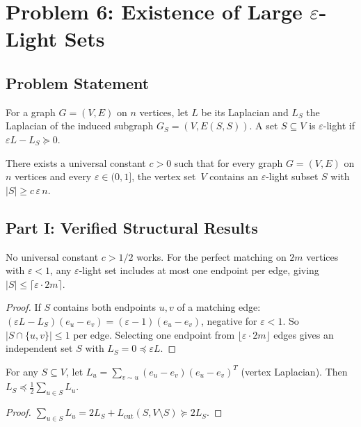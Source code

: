 \section{Problem 6: Existence of Large $\varepsilon$-Light Sets}\label{sec:q6}

\subsection*{Problem Statement}
For a graph $G=(V,E)$ on $n$ vertices, let $L$ be its Laplacian and $L_S$ the Laplacian of the induced subgraph $G_S=(V,E(S,S))$. A set $S\subseteq V$ is $\varepsilon$-light if $\varepsilon L-L_S\succeq 0$.

\begin{conjecture}[Q6]\label{conj:q6}
There exists a universal constant $c>0$ such that for every graph $G=(V,E)$ on $n$ vertices and every $\varepsilon\in(0,1]$, the vertex set~$V$ contains an $\varepsilon$-light subset $S$ with $|S|\ge c\,\varepsilon\, n$.
\end{conjecture}

\subsection*{Part I: Verified Structural Results}

\begin{proposition}\label{prop:q6-upper}
No universal constant $c>1/2$ works. For the perfect matching on $2m$ vertices with $\varepsilon<1$, any $\varepsilon$-light set includes at most one endpoint per edge, giving $|S|\le\lceil\varepsilon\cdot 2m\rceil$.
\end{proposition}

\begin{proof}
If $S$ contains both endpoints $u,v$ of a matching edge: $(\varepsilon L-L_S)(e_u-e_v)=(\varepsilon-1)(e_u-e_v)$, negative for $\varepsilon<1$. So $|S\cap\{u,v\}|\le 1$ per edge. Selecting one endpoint from $\lfloor\varepsilon\cdot 2m\rfloor$ edges gives an independent set $S$ with $L_S=0\preceq\varepsilon L$.
\end{proof}

\begin{lemma}[Linearization]\label{lem:q6-lin}
For any $S\subseteq V$, let $L_u=\sum_{v\sim u}(e_u-e_v)(e_u-e_v)^T$ (vertex Laplacian). Then $L_S\preceq\frac12\sum_{u\in S}L_u$.
\end{lemma}

\begin{proof}
$\sum_{u\in S}L_u=2L_S+L_{\mathrm{cut}}(S,V\setminus S)\succeq 2L_S$.
\end{proof}

